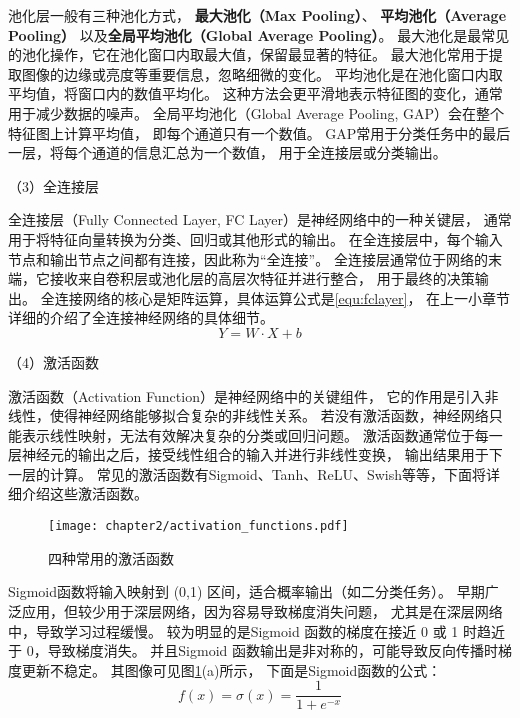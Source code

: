 池化层一般有三种池化方式，
\textbf{最大池化（Max Pooling）}、
\textbf{平均池化（Average Pooling）}
以及\textbf{全局平均池化}\cite{lin2013network}\textbf{（Global Average Pooling）}。
最大池化是最常见的池化操作，它在池化窗口内取最大值，保留最显著的特征。
最大池化常用于提取图像的边缘或亮度等重要信息，忽略细微的变化。
平均池化是在池化窗口内取平均值，将窗口内的数值平均化。
这种方法会更平滑地表示特征图的变化，通常用于减少数据的噪声。
全局平均池化（Global Average Pooling, GAP）会在整个特征图上计算平均值，
即每个通道只有一个数值。
GAP常用于分类任务中的最后一层，将每个通道的信息汇总为一个数值，
用于全连接层或分类输出。

（3）全连接层

全连接层（Fully Connected Layer, FC Layer）是神经网络中的一种关键层，
通常用于将特征向量转换为分类、回归或其他形式的输出。
在全连接层中，每个输入节点和输出节点之间都有连接，因此称为“全连接”。
全连接层通常位于网络的末端，它接收来自卷积层或池化层的高层次特征并进行整合，
用于最终的决策输出。
全连接网络的核心是矩阵运算，具体运算公式是\ref{equ:fclayer}，
在上一小章节详细的介绍了全连接神经网络的具体细节。
\begin{equation}
    \label{equ:fclayer}
    Y = W \cdot X + b
\end{equation}

（4）激活函数

激活函数\cite{sharma2017activation}（Activation Function）是神经网络中的关键组件，
它的作用是引入非线性，使得神经网络能够拟合复杂的非线性关系。
若没有激活函数，神经网络只能表示线性映射，无法有效解决复杂的分类或回归问题。
激活函数通常位于每一层神经元的输出之后，接受线性组合的输入并进行非线性变换，
输出结果用于下一层的计算。
常见的激活函数有Sigmoid、Tanh、ReLU、Swish等等，下面将详细介绍这些激活函数。
\begin{figure}[H]
    \centering
    \texttt{[image: chapter2/activation\_functions.pdf]}
    \caption{\label{fig:2-2-2-activate_fc}四种常用的激活函数}
\end{figure}
Sigmoid函数将输入映射到 (0,1) 区间，适合概率输出（如二分类任务）。
早期广泛应用，但较少用于深层网络，因为容易导致梯度消失问题，
尤其是在深层网络中，导致学习过程缓慢。
较为明显的是Sigmoid 函数的梯度在接近 0 或 1 时趋近于 0，导致梯度消失。
并且Sigmoid 函数输出是非对称的，可能导致反向传播时梯度更新不稳定。
其图像可见图\ref{fig:2-2-2-activate_fc}(a)所示，
下面是Sigmoid函数的公式：
\begin{equation}
    f(x) = \sigma (x) = \frac{1}{1+e^{-x}}
\end{equation}

